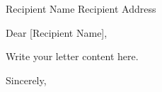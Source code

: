 \documentclass{letter}
\begin{document}
\begin{letter}{Recipient Name \newline Recipient Address}

\opening{Dear [Recipient Name],}

Write your letter content here.

\closing{Sincerely,}

\end{letter}
\end{document}
